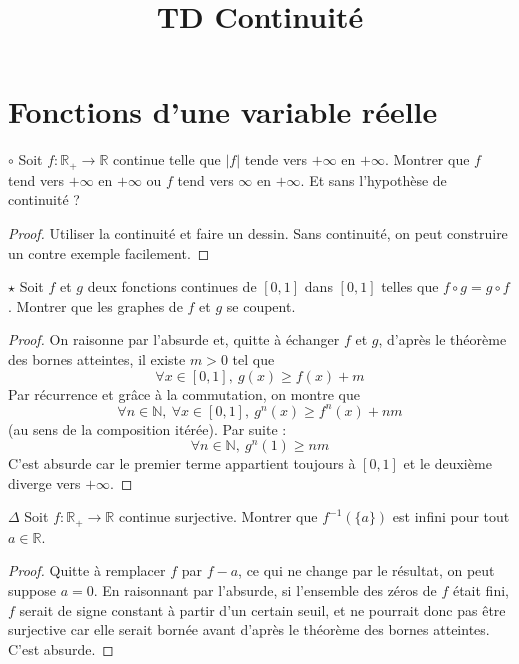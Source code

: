 \documentclass[french,a4paper]{article}
\title{TD Continuité}
\newcommand{\N}{\mathbb{N}}
\newcommand{\R}{\mathbb{R}}
\newcommand{\inv}{^{-1}}
\theoremstyle{plain}
\theoremstyle{definition}
\theoremstyle{remark}
\begin{document}
\maketitle

\section{Fonctions d'une variable réelle}

\begin{ex}{$\circ$}
	Soit $f:\R_+\to\R$ continue telle que $\lvert f\rvert$ tende vers $+\infty$ en $+\infty$. Montrer que $f$ tend vers $+\infty$ en $+\infty$ ou $f$ tend vers $\infty$ en $+\infty$. Et sans l'hypothèse de continuité ?
\end{ex}
\begin{proof}
	Utiliser la continuité et faire un dessin. Sans continuité, on peut construire un contre exemple facilement.
\end{proof}

\begin{ex}{$\star$}
	Soit $f$ et $g$ deux fonctions continues de $[0,1]$ dans $[0,1]$ telles que $f\circ g=g\circ f$. Montrer que les graphes de $f$ et $g$ se coupent.
\end{ex}
\begin{proof}
	On raisonne par l'absurde et, quitte à échanger $f$ et $g$, d'après le théorème des bornes atteintes, il existe $m>0$ tel que $$\forall x\in[0,1],\ g(x)\geqslant f(x)+m$$ Par récurrence et grâce à la commutation, on montre que $$\forall n\in\N,\ \forall x\in[0,1],\ g^n(x)\geqslant f^n(x)+nm$$ (au sens de la composition itérée).  Par suite : $$\forall n\in\N, \ g^n(1)\geqslant nm$$ C'est absurde car le premier terme appartient toujours à $[0,1]$ et le deuxième diverge vers $+\infty$.
\end{proof}

\begin{ex}{$\Delta$}
	Soit $f:\R_+\to\R$ continue surjective. Montrer que $f\inv\left(\{a\}\right)$ est infini pour tout $a\in\R$.
\end{ex}
\begin{proof}
	Quitte à remplacer $f$ par $f-a$, ce qui ne change par le résultat, on peut suppose $a=0$. En raisonnant par l'absurde, si l'ensemble des zéros de $f$ était fini, $f$ serait de signe constant à partir d'un certain seuil, et ne pourrait donc pas être surjective car elle serait bornée avant d'après le théorème des bornes atteintes. C'est absurde.
\end{proof}
\end{document}
